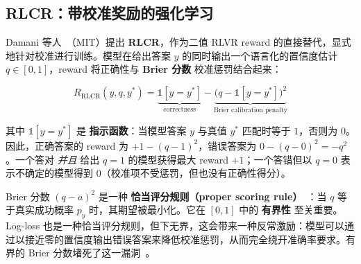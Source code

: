 \subsection{RLCR：带校准奖励的强化学习}
\label{subsec:rlcr}

Damani 等人~\cite{damani2025rlcr}（MIT）提出 \textbf{RLCR}，作为二值 RLVR reward 的直接替代，显式地针对校准进行训练。模型在给出答案 $y$ 的同时输出一个语言化的置信度估计 $q \in [0,1]$，reward 将正确性与 \textbf{Brier 分数} 校准惩罚结合起来：

\begin{equation}
\boxed{R_{\mathrm{RLCR}}(y, q, y^*) = \underbrace{\mathbb{1}[y = y^*]}_{\text{correctness}} - \underbrace{\bigl(q - \mathbb{1}[y = y^*]\bigr)^2}_{\text{Brier calibration penalty}}}
\end{equation}

其中 $\mathbb{1}[y = y^*]$ 是 \textbf{指示函数}：当模型答案 $y$ 与真值 $y^*$ 匹配时等于 $1$，否则为 $0$。因此，正确答案的 reward 为 $+1 - (q-1)^2$，错误答案为 $0 - (q-0)^2 = -q^2$。一个答对 \emph{并且} 给出 $q=1$ 的模型获得最大 reward $+1$；一个答错但以 $q=0$ 表示不确定的模型得到 $0$（校准项不受惩罚，但也没有正确性得分）。

Brier 分数 $(q - a)^2$ 是一种 \textbf{恰当评分规则（proper scoring rule）}~\cite{gneiting2007strictly}：当 $q$ 等于真实成功概率 $p_y$ 时，其期望被最小化。它在 $[0,1]$ 中的 \textbf{有界性} 至关重要。Log-loss 也是一种恰当评分规则，但下无界，这会带来一种反常激励：模型可以通过以接近零的置信度输出错误答案来降低校准惩罚，从而完全绕开准确率要求。有界的 Brier 分数堵死了这一漏洞~\cite{damani2025rlcr}。

